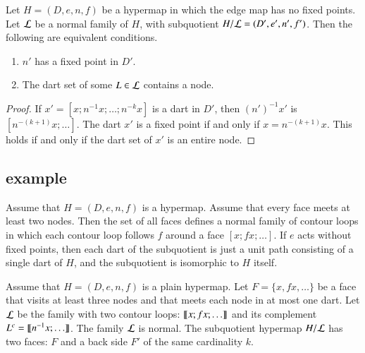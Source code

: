 \begin{lemma}\label{lemma:nfp}
Let $H=(D,e,n,f)$ be a hypermap in which the edge map has no fixed points.
Let ${\cal  L}$ be a normal family of $H$, with subquotient $H/{\cal L} = (D',e',n',f')$.  
Then the following are equivalent conditions.
\begin{enumerate}\wasitemize 
\item $n'$ has a fixed point in $D'$.
\item The dart set of some $L\in {\cal L}$ contains a node.
\end{enumerate}\wasitemize 
\end{lemma}

\begin{proof}
If $x'=[x;n^{-1} x;\ldots;n^{-k} x]$ is a dart in $D'$, then $(n')^{-1}x'$ is
$[n^{-(k+1)} x;\ldots]$.  The dart $x'$ is a fixed point if and only if
$x = n^{-(k+1)} x$.  This holds if and only if the dart set of $x'$ is an entire node.
\end{proof}

\subsection{example}

\begin{example}\label{ex:Hall} 
  Assume that $H=(D,e,n,f)$ is a
  hypermap. %
  Assume that every face meets at least two nodes. Then the set of all
  faces defines a normal family of contour loops in which each contour loop follows $f$ around
  a face $[x;f x;\ldots]$.  If $e$ acts without fixed points, then
  each dart of the subquotient is just a unit path consisting of a single
  dart of $H$, and the subquotient is isomorphic to $H$ itself.
\end{example}

\begin{example}\label{ex:H2} 
  Assume that $H=(D,e,n,f)$ is a plain hypermap.  Let $F = \{x,f x,\ldots\}$ be a face
  that visits at least three nodes and that meets each node in at most
  one dart.  Let $\cal L$ be the family with two contour loops: ${\llbracket{x;f x;\ldots}\rrbracket}$ 
and its complement $L^c = {\llbracket{n^{-1} x;\ldots}\rrbracket}$.
The family $\cal L$ is normal. The subquotient hypermap $H/{\cal L}$ has
two faces: $F$ and a back side $F'$ of the same cardinality $k$.
%
\end{example}

